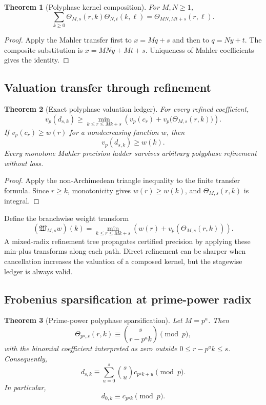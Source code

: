 \documentclass[11pt]{article}
\newtheorem{theorem}{Theorem}[section]\newtheorem{proposition}[theorem]{Proposition}\newtheorem{lemma}[theorem]{Lemma}\newtheorem{corollary}[theorem]{Corollary}
\theoremstyle{definition}\newtheorem{definition}[theorem]{Definition}\newtheorem{example}[theorem]{Example}\newtheorem{construction}[theorem]{Construction}\newtheorem{algorithm}[theorem]{Algorithm}\newtheorem{conjecture}[theorem]{Conjecture}\newtheorem{problem}[theorem]{Problem}
\theoremstyle{remark}\newtheorem{remark}[theorem]{Remark}\newtheorem{boundary}[theorem]{Boundary}\newtheorem{certificate}[theorem]{Computational Certificate}\newtheorem{classical}[theorem]{Classical Input}\newtheorem{principle}[theorem]{Structural Principle}
\begin{document}
\begin{theorem}[Polyphase kernel composition]
For $M,N\geq1$,
\[
 \boxed{\sum_{k\geq0}\Theta_{M,s}(r,k)\Theta_{N,t}(k,\ell)=\Theta_{MN,Mt+s}(r,\ell).}
\]
\end{theorem}

\begin{proof}
Apply the Mahler transfer first to $x=Mq+s$ and then to $q=Ny+t$. The composite substitution is $x=MNy+Mt+s$. Uniqueness of Mahler coefficients gives the identity.
\end{proof}

\subsection{Valuation transfer through refinement}
\begin{theorem}[Exact polyphase valuation ledger]
For every refined coefficient,
\[
 \boxed{v_p(d_{s,k})\geq\min_{k\leq r\leq Mk+s}\left(v_p(c_r)+v_p\bigl(\Theta_{M,s}(r,k)\bigr)\right).}
\]
If $v_p(c_r)\geq w(r)$ for a nondecreasing function $w$, then
\[
 \boxed{v_p(d_{s,k})\geq w(k).}
\]
Every monotone Mahler precision ladder survives arbitrary polyphase refinement without loss.
\end{theorem}

\begin{proof}
Apply the non-Archimedean triangle inequality to the finite transfer formula. Since $r\geq k$, monotonicity gives $w(r)\geq w(k)$, and $\Theta_{M,s}(r,k)$ is integral.
\end{proof}

Define the branchwise weight transform
\[
 \boxed{(\mathfrak W_{M,s}w)(k)=\min_{k\leq r\leq Mk+s}\left(w(r)+v_p(\Theta_{M,s}(r,k))\right).}
\]
A mixed-radix refinement tree propagates certified precision by applying these min-plus transforms along each path. Direct refinement can be sharper when cancellation increases the valuation of a composed kernel, but the stagewise ledger is always valid.

\subsection{Frobenius sparsification at prime-power radix}
\begin{theorem}[Prime-power polyphase sparsification]
Let $M=p^a$. Then
\[
 \boxed{\Theta_{p^a,s}(r,k)\equiv\binom{s}{r-p^ak}\pmod p,}
\]
with the binomial coefficient interpreted as zero outside $0\leq r-p^ak\leq s$. Consequently,
\[
 \boxed{d_{s,k}\equiv\sum_{u=0}^{s}\binom su c_{p^ak+u}\pmod p.}
\]
In particular,
\[
 \boxed{d_{0,k}\equiv c_{p^ak}\pmod p.}
\]
\end{theorem}
\end{document}

